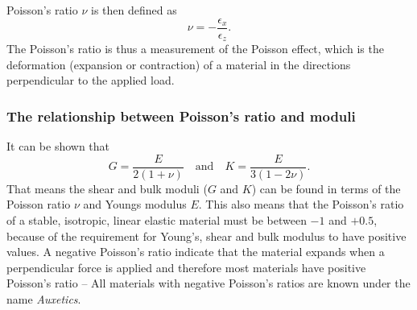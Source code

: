 Poisson's ratio $\nu$ is then defined as
\[ 
\nu = - \frac{\epsilon_x}{\epsilon_z}
.\]
The Poisson's ratio is thus a measurement of the Poisson effect, which is the deformation (expansion or contraction) of a material in the directions perpendicular to the applied load.

\subsubsection{The relationship between Poisson's ratio and moduli}
It can be shown that
\[ 
G = \frac{E}{2(1+\nu)} \quad \text{and} \quad K = \frac{E}{3(1-2\nu)}
.\]
That means the shear and bulk moduli ($G$ and $K$) can be found in terms of the Poisson ratio $\nu$ and Youngs modulus $E$. This also means that the Poisson's ratio of a stable, isotropic, linear elastic material must be between $-1$ and $+0.5$, because of the requirement for Young's, shear and bulk modulus to have positive values. A negative Poisson's ratio indicate that the material expands when a perpendicular force is applied and therefore most materials have positive Poisson's ratio -- All materials with negative Poisson's ratios are known under the name \textit{Auxetics}.
